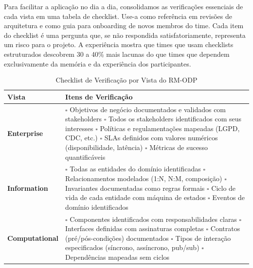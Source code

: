 Para facilitar a aplicação no dia a dia, consolidamos as verificações essenciais
de cada vista em uma tabela de checklist. Use-a como referência em revisões de
arquitetura e como guia para onboarding de novos membros do time. Cada item do
checklist é uma pergunta que, se não respondida satisfatoriamente, representa
um risco para o projeto. A experiência mostra que times que usam checklists
estruturados descobrem 30 a 40\% mais lacunas do que times que dependem
exclusivamente da memória e da experiência dos participantes.

\begin{table}[htbp]
\centering
\caption{Checklist de Verificação por Vista do RM-ODP}
\label{tab:checklist-viewpoints}
\begin{tabular}{@{}lp{10cm}@{}}
\toprule
\textbf{Vista} & \textbf{Itens de Verificação} \\
\midrule
\textbf{Enterprise} &
$\square$ Objetivos de negócio documentados e validados com stakeholders \newline
$\square$ Todos os stakeholders identificados com seus interesses \newline
$\square$ Políticas e regulamentações mapeadas (LGPD, CDC, etc.) \newline
$\square$ SLAs definidos com valores numéricos (disponibilidade, latência) \newline
$\square$ Métricas de sucesso quantificáveis \\
\addlinespace
\textbf{Information} &
$\square$ Todas as entidades do domínio identificadas \newline
$\square$ Relacionamentos modelados (1:N, N:M, composição) \newline
$\square$ Invariantes documentadas como regras formais \newline
$\square$ Ciclo de vida de cada entidade com máquina de estados \newline
$\square$ Eventos de domínio identificados \\
\addlinespace
\textbf{Computational} &
$\square$ Componentes identificados com responsabilidades claras \newline
$\square$ Interfaces definidas com assinaturas completas \newline
$\square$ Contratos (pré/pós-condições) documentados \newline
$\square$ Tipos de interação especificados (síncrono, assíncrono, pub/sub) \newline
$\square$ Dependências mapeadas sem ciclos \\

\end{tabular}
\end{table}
